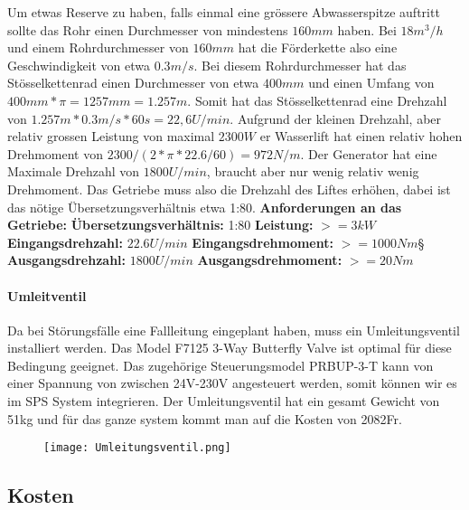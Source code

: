 Um etwas Reserve zu haben, falls einmal eine grössere Abwasserspitze auftritt sollte das Rohr einen Durchmesser von mindestens \(160mm\) haben. Bei \(18 m^3 /h \) und einem Rohrdurchmesser von \(160mm\) hat die Förderkette also eine Geschwindigkeit von etwa \(0.3 m/s \). Bei diesem Rohrdurchmesser hat das Stösselkettenrad einen Durchmesser von etwa \(400mm\)\cite{schrage} und einen Umfang von \(400mm * \pi = 1257mm = 1.257m\). Somit hat das Stösselkettenrad eine Drehzahl von \(1.257m * 0.3 m/s * 60s = 22,6 U/min\). Aufgrund der kleinen Drehzahl, aber relativ grossen Leistung von maximal \(2300 W\) er Wasserlift hat einen relativ hohen Drehmoment von \( 2300 /(2 * \pi * 22.6/ 60) = 972 N/m\). Der Generator hat eine Maximale Drehzahl von \(1800 U/min\), braucht aber nur wenig relativ wenig Drehmoment. Das Getriebe muss also die Drehzahl des Liftes erhöhen, dabei ist das nötige Übersetzungsverhältnis etwa 1:80. 
\textbf{Anforderungen an das Getriebe:}				\newline
\textbf{Übersetzungsverhältnis:}	1:80			\newline
\textbf{Leistung:}					\(>=3 kW\)		\newline
\textbf{Eingangsdrehzahl:}			\(22.6 U/min\)	\newline
\textbf{Eingangsdrehmoment:}		\(>=1000 Nm\)§	\newline
\textbf{Ausgangsdrehzahl:}			\(1800 U/min\)	\newline
\textbf{Ausgangsdrehmoment:}		\(>= 20 Nm\)	\newline


\paragraph{Umleitventil}


Da bei Störungsfälle eine Fallleitung eingeplant haben, muss ein Umleitungsventil installiert werden. Das Model F7125 3-Way Butterfly Valve ist optimal für diese Bedingung geeignet. Das zugehörige Steuerungsmodel PRBUP-3-T kann von einer Spannung von zwischen 24V-230V angesteuert werden, somit können wir es im SPS System integrieren. Der Umleitungsventil hat ein gesamt Gewicht von 51\si{kg} und für das ganze system kommt man auf die Kosten von 2082\si{Fr}.

 \begin{figure} [H]
	\centering
	\texttt{[image: Umleitungsventil.png]}
	\label{fig:Umleitungsventil}
\end{figure}


\cite{Belimo}
\subsection{Kosten}

